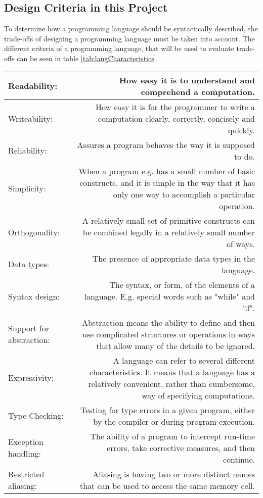 \subsection{Design Criteria in this Project}
\label{sec:DesignCriteria}
To determine how a programming language should be syntactically described, the trade-offs of designing a programming language must be taken into account. The different criteria of a programming language, that will be used to evaluate trade-offs can be seen in table \ref{tab:langCharacteristics}.
\begin{table}[H]
	\begin{tabularx}{\textwidth}{|l|R|}
		\hline
		
		Readability:				& How easy it is to understand and comprehend a computation. 		\\ \hline
		Writeability:				& How easy it is for the programmer to write a computation clearly, correctly, concisely and quickly.\\ \hline
		Reliability: 			& Assures a program behaves the way it is supposed to do.	\\ \hline
		Simplicity:				& When a program e.g. has a small number of basic constructs, and it is simple in the way that it has only one way to 									accomplish a particular operation.\\ \hline
		Orthogonality: 			& A relatively small set of primitive constructs can be combined legally in a relatively small number of ways.\\ \hline	
		Data types:				& The presence of appropriate data types in the language.\\ \hline
		Syntax design:			& The syntax, or form, of the elements of a language. E.g. special words such as "while" and "if".\\ \hline
		Support for abstraction:	& Abstraction means the ability to define and then use complicated structures or operations in ways that allow many of the 									details	to be ignored.\\ \hline
		Expressivity:			& A language can refer to several different characteristics. It means that a language has a relatively convenient, rather 									than cumbersome, way of specifying computations.\\ \hline
		Type Checking:			& Testing for type errors in a given program, either by the compiler or during program execution.\\ \hline
		Exception handling:		& The ability of a program to intercept run-time errors, take corrective measures, and then continue.\\ \hline
		Restricted aliasing:		& Aliasing is having two or more distinct names that can be used to	access the same memory cell.\\ \hline
		

\end{tabularx}
\end{table}
